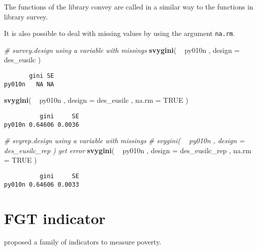 \documentclass[]{book}
\newenvironment{Shaded}{\begin{snugshade}}{\end{snugshade}}
\newcommand{\KeywordTok}[1]{\textcolor[rgb]{0.13,0.29,0.53}{\textbf{{#1}}}}
\newcommand{\DataTypeTok}[1]{\textcolor[rgb]{0.13,0.29,0.53}{{#1}}}
\newcommand{\StringTok}[1]{\textcolor[rgb]{0.31,0.60,0.02}{{#1}}}
\newcommand{\CommentTok}[1]{\textcolor[rgb]{0.56,0.35,0.01}{\textit{{#1}}}}
\newcommand{\OtherTok}[1]{\textcolor[rgb]{0.56,0.35,0.01}{{#1}}}
\newcommand{\NormalTok}[1]{{#1}}
\begin{document}
The functions of the library convey are called in a similar way to the
functions in library survey.

It is also possible to deal with missing values by using the argument
\texttt{na.rm}.

\begin{Shaded}
\begin{Highlighting}[]
\CommentTok{# survey.design using a variable with missings}
\KeywordTok{svygini}\NormalTok{( ~}\StringTok{ }\NormalTok{py010n , }\DataTypeTok{design =} \NormalTok{des_eusilc )}
\end{Highlighting}
\end{Shaded}

\begin{verbatim}
       gini SE
py010n   NA NA
\end{verbatim}

\begin{Shaded}
\begin{Highlighting}[]
\KeywordTok{svygini}\NormalTok{( ~}\StringTok{ }\NormalTok{py010n , }\DataTypeTok{design =} \NormalTok{des_eusilc , }\DataTypeTok{na.rm =} \OtherTok{TRUE} \NormalTok{)}
\end{Highlighting}
\end{Shaded}

\begin{verbatim}
          gini     SE
py010n 0.64606 0.0036
\end{verbatim}

\begin{Shaded}
\begin{Highlighting}[]
\CommentTok{# svyrep.design using a variable with missings}
\CommentTok{# svygini( ~ py010n , design = des_eusilc_rep ) get error}
\KeywordTok{svygini}\NormalTok{( ~}\StringTok{ }\NormalTok{py010n , }\DataTypeTok{design =} \NormalTok{des_eusilc_rep , }\DataTypeTok{na.rm =} \OtherTok{TRUE} \NormalTok{)}
\end{Highlighting}
\end{Shaded}

\begin{verbatim}
          gini     SE
py010n 0.64606 0.0033
\end{verbatim}

\section{FGT indicator}\label{fgt-indicator}

\citep{foster1984} proposed a family of indicators to measure poverty.
\end{document}
